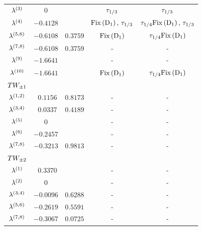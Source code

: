 \begin{table}[h!t]
\begin{center}
\begin{tabular}{ccccc}
  $\eigExp[3]$   &$0$       &          & $\tau_{1/3}$    & $\tau_{1/3}$\\
  $\eigExp[4]$   &$-0.4128$ &          & $\mathrm{Fix}\left(\mathrm{D}_{1}\right),\,\tau_{1/3}$  & $\tau_{1/4}\mathrm{Fix}\left(\mathrm{D}_{1}\right),\,\tau_{1/3}$\\
  $\eigExp[5,6]$ &$-0.6108$ & $0.3759$ & $\mathrm{Fix}\left(\mathrm{D}_{1}\right)$     & $\tau_{1/4}\mathrm{Fix}\left(\mathrm{D}_{1}\right)$\\
  $\eigExp[7,8]$ &$-0.6108$ & $0.3759$ & -         & -\\
  $\eigExp[9]$   &$-1.6641$ &          & -         & -\\
  $\eigExp[10]$  &$-1.6641$ &          & $\mathrm{Fix}\left(\mathrm{D}_{1}\right)$     & $\tau_{1/4}\mathrm{Fix}\left(\mathrm{D}_{1}\right)$ \\[2ex]
$TW_{\pm1}$&  &  & \\\hline
  $\eigExp[1,2]$ & $\ \ 0.1156$ & $0.8173$ & -  & -\\
  $\eigExp[3,4]$ & $\ \ 0.0337$ & $0.4189$ & -  & -\\
  $\eigExp[5]$   & $0$      &          & -  & -\\
  $\eigExp[6]$   &$-0.2457$ &          & -  & -\\
  $\eigExp[7,8]$ &$-0.3213$ & $0.9813$ & -  & -\\[2ex]
$TW_{\pm2}$&  &  & \\\hline
  $\eigExp[1]  $ & $\ \ 0.3370$ &          & -  & -\\
  $\eigExp[2]  $ & $0$      &          & -  & -\\
  $\eigExp[3,4]$ &$-0.0096$ & $0.6288$ & -  & -\\
  $\eigExp[5,6]$ &$-0.2619$ & $0.5591$ & -  & -\\
  $\eigExp[7,8]$ &$-0.3067$ & $0.0725$ & -  & -\\
\end{tabular}
\end{center}
\end{table}


